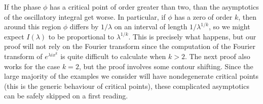     \begin{comment}


  \[ I(\lambda) = \int a(x) e^{i \lambda \phi(x)}\; dx = \int a_0(y) e^{i \lambda y^2}\; dy. \]
  Thus we can apply the previous theorem to conclude that there exists a sequence of constants $\{ c_n \}$ such that for each $N$,
  \[ \left( \frac{d}{d\lambda} \right)^k I(\lambda) = \left( \frac{d}{d\lambda} \right)^k \left\{ \lambda^{-1/2} \sum_{n = 0}^N c_n \lambda^{-n} \right\} + O_{\phi,a,N,k}(1/\lambda^{N+m+3/2}). \]
  The existence in this theorem is a \emph{constructive} existence statement. The proof gives an effective algorithm to produce as many constants $c_n$ as required for any particular phase $\phi$, provided one can explicitly write out the function $y(x)$. In particular, if the phase has only a single stationary point at the origin,
  \[ c_0 = 2^{-1/2} e^{i\pi/4} a_0(0) = 2^{-1/2} e^{i\pi/4} a(0) / y'(0). \]
  Since
  \begin{align*}
    y'(0) &= \lim_{x \to 0^+} y'(x) = \lim_{x \to 0^+} \frac{\phi'(x)}{2 \phi(x)^{1/2}}\\
    &= \lim_{x \to 0^+} (1/2) \frac{\phi'(x)}{x} \left( \frac{x^2}{\phi(x)} \right)^{1/2} = (\phi''(0)/2)^{1/2}.
  \end{align*}
  This means that $c_0 = e^{i\pi/4} a(0) \phi''(0)^{-1/2}$.
  \end{comment}

If the phase $\phi$ has a critical point of order greater than two, than the asymptotics of the oscillatory integral get worse. In particular, if $\phi$ has a zero of order $k$, then around this region $\phi$ differs by $1/\lambda$ on an interval of length $1/\lambda^{1/k}$, so we might expect $I(\lambda)$ to be proportional to $\lambda^{1/k}$. This is precisely what happens, but our proof will not rely on the Fourier transform since the computation of the Fourier transform of $e^{\lambda ix^k}$ is quite difficult to calculate when $k > 2$. The next proof also works for the case $k = 2$, but the proof involves some contour shifting. Since the large majority of the examples we consider will have nondegenerate critical points (this is the generic behaviour of critical points), these complicated asymptotics can be safely skipped on a first reading.

